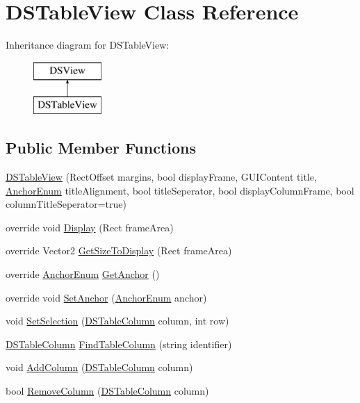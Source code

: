 \hypertarget{class_d_s_table_view}{\section{D\+S\+Table\+View Class Reference}
\label{class_d_s_table_view}
}
Inheritance diagram for D\+S\+Table\+View\+:\begin{figure}[H]
\begin{center}
\leavevmode
\includegraphics[height=2.000000cm]{class_d_s_table_view}
\end{center}
\end{figure}
\subsection*{Public Member Functions}
\begin{DoxyCompactItemize}
\item 
\hyperlink{class_d_s_table_view_a85beeb9fe37801e904cd2c108287ad13}{D\+S\+Table\+View} (Rect\+Offset margins, bool display\+Frame, G\+U\+I\+Content title, \hyperlink{class_d_s_view_a8b41b9ec1b18bd33872a37cbd3a2dbe1}{Anchor\+Enum} title\+Alignment, bool title\+Seperator, bool display\+Column\+Frame, bool column\+Title\+Seperator=true)
\item 
override void \hyperlink{class_d_s_table_view_aaf735ceab64aee38ae415fec5eb74f02}{Display} (Rect frame\+Area)
\item 
override Vector2 \hyperlink{class_d_s_table_view_a1fd415959161f295922c0abe39a8d697}{Get\+Size\+To\+Display} (Rect frame\+Area)
\item 
override \hyperlink{class_d_s_view_a8b41b9ec1b18bd33872a37cbd3a2dbe1}{Anchor\+Enum} \hyperlink{class_d_s_table_view_af4d30a29e4f5a330acc424ab86dacb6d}{Get\+Anchor} ()
\item 
override void \hyperlink{class_d_s_table_view_ad3f325f10cb987cd908b7a33d5686e3c}{Set\+Anchor} (\hyperlink{class_d_s_view_a8b41b9ec1b18bd33872a37cbd3a2dbe1}{Anchor\+Enum} anchor)
\item 
void \hyperlink{class_d_s_table_view_a7bfe9118e642d76a3b66b3c94cd86962}{Set\+Selection} (\hyperlink{class_d_s_table_column}{D\+S\+Table\+Column} column, int row)
\item 
\hyperlink{class_d_s_table_column}{D\+S\+Table\+Column} \hyperlink{class_d_s_table_view_a7c3bb648bce2cf1fb08256f95267edef}{Find\+Table\+Column} (string identifier)
\item 
void \hyperlink{class_d_s_table_view_a7ae3829a0cd72e629fce2de9467be0c7}{Add\+Column} (\hyperlink{class_d_s_table_column}{D\+S\+Table\+Column} column)
\item 
bool \hyperlink{class_d_s_table_view_a8c013e893cda97bcaf75c83f9ba63072}{Remove\+Column} (\hyperlink{class_d_s_table_column}{D\+S\+Table\+Column} column)
\end{DoxyCompactItemize}
